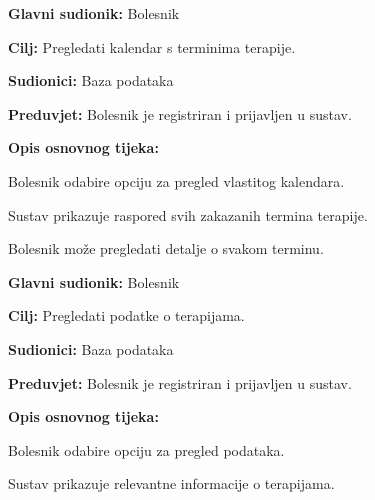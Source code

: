 \vspace{1em} %
\noindent{}
\begin{packed_item}
	\item \textbf{Glavni sudionik:} Bolesnik
	\item \textbf{Cilj:} Pregledati kalendar s terminima terapije.
	\item \textbf{Sudionici:} Baza podataka
	\item \textbf{Preduvjet:} Bolesnik je registriran i prijavljen u sustav.
	\item \textbf{Opis osnovnog tijeka:}
	\begin{packed_enum}
		\item Bolesnik odabire opciju za pregled vlastitog kalendara.
		\item Sustav prikazuje raspored svih zakazanih termina terapije.
		\item Bolesnik može pregledati detalje o svakom terminu.
	\end{packed_enum}
\end{packed_item}

\vspace{1em} %
\noindent{}
\begin{packed_item}
	\item \textbf{Glavni sudionik:} Bolesnik
	\item \textbf{Cilj:} Pregledati podatke o terapijama.
	\item \textbf{Sudionici:} Baza podataka
	\item \textbf{Preduvjet:} Bolesnik je registriran i prijavljen u sustav.
	\item \textbf{Opis osnovnog tijeka:}
	\begin{packed_enum}
		\item Bolesnik odabire opciju za pregled podataka.
		\item Sustav prikazuje relevantne informacije o terapijama.
	\end{packed_enum}
\end{packed_item}


